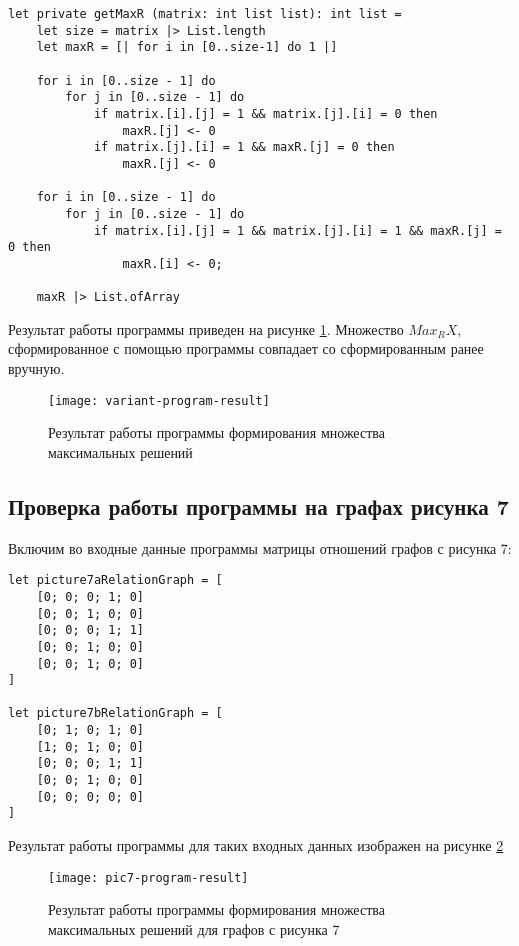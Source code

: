 \documentclass[a4paper,14pt]{extarticle}
\begin{document}
\begin{lstlisting}
let private getMaxR (matrix: int list list): int list =
    let size = matrix |> List.length
    let maxR = [| for i in [0..size-1] do 1 |]

    for i in [0..size - 1] do
        for j in [0..size - 1] do
            if matrix.[i].[j] = 1 && matrix.[j].[i] = 0 then
                maxR.[j] <- 0
            if matrix.[j].[i] = 1 && maxR.[j] = 0 then
                maxR.[j] <- 0

    for i in [0..size - 1] do
        for j in [0..size - 1] do
            if matrix.[i].[j] = 1 && matrix.[j].[i] = 1 && maxR.[j] = 0 then
                maxR.[i] <- 0;

    maxR |> List.ofArray
\end{lstlisting}

Результат работы программы приведен на рисунке \ref{fig:variant-program-result}.
Множество $Max_R X$, сформированное с помощью программы совпадает со
сформированным ранее вручную.

\begin{figure}[H]
    \centering
    \texttt{[image: variant-program-result]}
    \caption{Результат работы программы формирования множества максимальных решений}
    \label{fig:variant-program-result}
\end{figure}

\subsection{Проверка работы программы на графах рисунка 7}
Включим во входные данные программы матрицы отношений графов с рисунка 7:

\begin{lstlisting}
let picture7aRelationGraph = [
    [0; 0; 0; 1; 0]
    [0; 0; 1; 0; 0]
    [0; 0; 0; 1; 1]
    [0; 0; 1; 0; 0]
    [0; 0; 1; 0; 0]
]

let picture7bRelationGraph = [
    [0; 1; 0; 1; 0]
    [1; 0; 1; 0; 0]
    [0; 0; 0; 1; 1]
    [0; 0; 1; 0; 0]
    [0; 0; 0; 0; 0]
]
\end{lstlisting}

Результат работы программы для таких входных данных изображен на рисунке
\ref{fig:pic7-program-result}

\begin{figure}[H]
    \centering
    \texttt{[image: pic7-program-result]}
    \caption{Результат работы программы формирования множества максимальных решений для графов с рисунка 7}
    \label{fig:pic7-program-result}
\end{figure}
\end{document}

